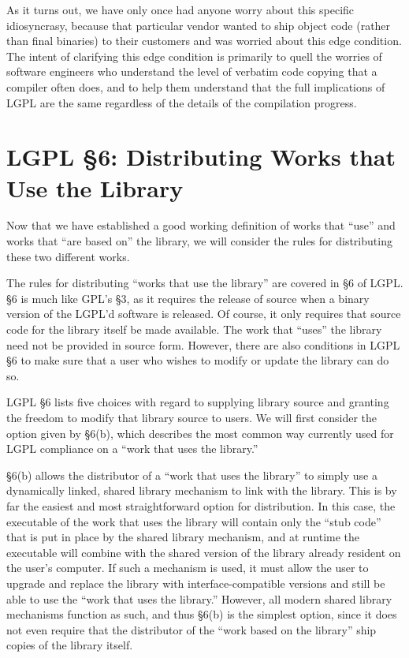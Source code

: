\documentclass[11pt, letterpaper]{book}
\begin{document}
As it turns out, we have only once had anyone worry about this specific
idiosyncrasy, because that particular vendor wanted to ship object code
(rather than final binaries) to their customers and was worried about
this edge condition. The intent of clarifying this edge condition is
primarily to quell the worries of software engineers who understand the
level of verbatim code copying that a compiler often does, and to help
them understand that the full implications of LGPL are the same regardless
of the details of the compilation progress.

\section{LGPL \S 6: Distributing Works that Use the Library}
\label{lgpl-section-6}
Now that we have established a good working definition of works that
``use'' and works that ``are based on'' the library, we will consider the
rules for distributing these two different works.

The rules for distributing ``works that use the library'' are covered in
\S 6 of LGPL\@. \S 6 is much like GPL's \S 3, as it requires the release
of source when a binary version of the LGPL'd software is released. Of
course, it only requires that source code for the library itself be made
available. The work that ``uses'' the library need not be provided in
source form. However, there are also conditions in LGPL \S 6 to make sure
that a user who wishes to modify or update the library can do so.

LGPL \S 6 lists five choices with regard to supplying library source
and granting the freedom to modify that library source to users. We
will first consider the option given by \S 6(b), which describes the
most common way currently used for LGPL compliance on a ``work that
uses the library.''

\S 6(b) allows the distributor of a ``work that uses the library'' to
simply use a dynamically linked, shared library mechanism to link with the
library. This is by far the easiest and most straightforward option for
distribution. In this case, the executable of the work that uses the
library will contain only the ``stub code'' that is put in place by the
shared library mechanism, and at runtime the executable will combine with
the shared version of the library already resident on the user's computer.
If such a mechanism is used, it must allow the user to upgrade and
replace the library with interface-compatible versions and still be able
to use the ``work that uses the library.''  However, all modern shared
library mechanisms function as such, and thus \S 6(b) is the simplest
option, since it does not even require that the distributor of the ``work
based on the library'' ship copies of the library itself.
\end{document}
